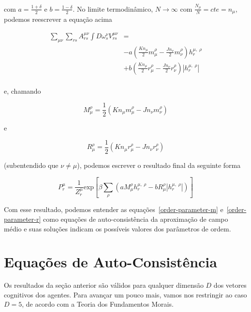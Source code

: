 \documentclass[a4paper, 11pt]{article} %
\newcommand{\agent}[2]{%
    \omega^{#2}_{#1}}
\newcommand{\pot}{\ensuremath{\displaystyle%
    V_{rs}^{\mu \nu}}}
\newcommand{\opn}[2]{\ensuremath{\displaystyle%
    h^{#2,\;\rho}_{#1}}}
\newcommand{\mh}[1]{\ensuremath{\displaystyle%
    m^{\rho}_{#1}}}
\newcommand{\rh}[1]{\ensuremath{\displaystyle%
    r^{\rho}_{#1}}}
\newcommand{\Mh}[1]{\ensuremath{\displaystyle%
    M^{\rho}_{#1}}}
\newcommand{\Rh}[1]{\ensuremath{\displaystyle%
    R^{\rho}_{#1}}}
\newcommand{\inp}[1]{\ensuremath{\displaystyle%
    \left(#1\right)}}
\newcommand{\ins}[1]{\ensuremath{\displaystyle%
    \left[#1\right]}}
\begin{document}
com $a=\frac{1+\delta}{2}$ e $b=\frac{1-\delta}{2}$. No limite termodinâmico, 
$N \to \infty$ com $\frac{N_{\mu}}{N} = \textit{cte} = n_{\mu}$, 
podemos reescrever a equação acima

\begin{equation}
    \begin{split}
        \sum_{\mu\nu}\sum_{rs}A^{\mu\nu}_{rs}\int D\agent{s}{\nu} \pot & = \\
        & 
        -a\inp{\frac{Kn_{\mu}}{2}\mh{\mu}-\frac{Jn_{\nu}}{2}\mh{\nu}}
        \opn{r}{\mu}\\
        &
        +b\inp{\frac{Kn_{\mu}}{2}\rh{\mu}-\frac{Jn_{\nu}}{2}\rh{\nu}}|
        \opn{r}{\mu}|\\
    \end{split}
\end{equation}

e, chamando 

\begin{equation}
    \Mh{\mu} = \frac{1}{2}\inp{Kn_{\mu}\mh{\mu}-Jn_{\nu}\mh{\nu}} 
\end{equation}

e 

\begin{equation}
    \Rh{\mu} = \frac{1}{2}\inp{Kn_{\mu}\rh{\mu}-Jn_{\nu}\rh{\nu}}
\end{equation}

(subentendido que $\nu\ne \mu$), podemos escrever
o resultado final da seguinte forma

\begin{equation}\label{mean-field-P}
    P_r^{\mu} = \frac{1}{Z_r^{\mu}} \mathrm{exp} \ins{%
        \beta\sum_{\rho}\inp{a\Mh{\mu}\opn{r}{\mu}-b\Rh{\mu}|\opn{r}{\mu}|}}
\end{equation}

Com esse resultado, podemos entender as equações~\ref{order-parameter-m} 
e~\ref{order-parameter-r} como equações de auto-consistência da aproximação de
campo médio e suas soluções indicam os possíveis valores dos parâmetros de
ordem. 


\section*{Equações de Auto-Consistência}

Os resultados da seção anterior são válidos para qualquer dimensão $D$ dos
vetores cognitivos dos agentes. Para avançar um pouco mais, vamos nos restringir
ao caso $D=5$, de acordo com a Teoria dos Fundamentos Morais. 
\end{document}
